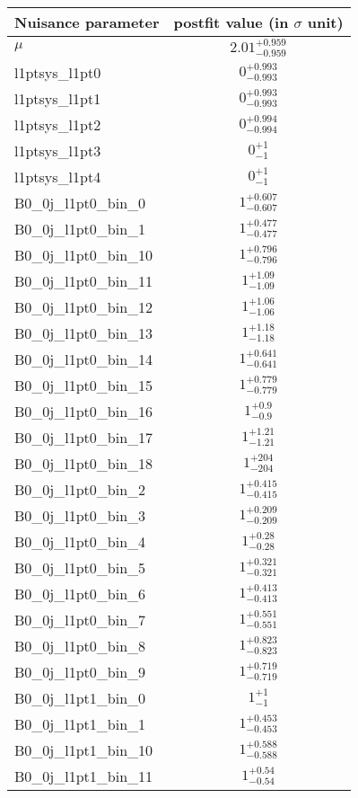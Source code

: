 
\begin{tabular}{|l|c|}
\hline
Nuisance parameter & postfit value (in $\sigma$ unit) \\\hline
$\mu$ & $2.01^{+0.959}_{-0.959}$ \\
l1ptsys\_l1pt0 & $0^{+0.993}_{-0.993}$ \\
l1ptsys\_l1pt1 & $0^{+0.993}_{-0.993}$ \\
l1ptsys\_l1pt2 & $0^{+0.994}_{-0.994}$ \\
l1ptsys\_l1pt3 & $0^{+1}_{-1}$ \\
l1ptsys\_l1pt4 & $0^{+1}_{-1}$ \\
B0\_0j\_l1pt0\_bin\_0 & $1^{+0.607}_{-0.607}$ \\
B0\_0j\_l1pt0\_bin\_1 & $1^{+0.477}_{-0.477}$ \\
B0\_0j\_l1pt0\_bin\_10 & $1^{+0.796}_{-0.796}$ \\
B0\_0j\_l1pt0\_bin\_11 & $1^{+1.09}_{-1.09}$ \\
B0\_0j\_l1pt0\_bin\_12 & $1^{+1.06}_{-1.06}$ \\
B0\_0j\_l1pt0\_bin\_13 & $1^{+1.18}_{-1.18}$ \\
B0\_0j\_l1pt0\_bin\_14 & $1^{+0.641}_{-0.641}$ \\
B0\_0j\_l1pt0\_bin\_15 & $1^{+0.779}_{-0.779}$ \\
B0\_0j\_l1pt0\_bin\_16 & $1^{+0.9}_{-0.9}$ \\
B0\_0j\_l1pt0\_bin\_17 & $1^{+1.21}_{-1.21}$ \\
B0\_0j\_l1pt0\_bin\_18 & $1^{+204}_{-204}$ \\
B0\_0j\_l1pt0\_bin\_2 & $1^{+0.415}_{-0.415}$ \\
B0\_0j\_l1pt0\_bin\_3 & $1^{+0.209}_{-0.209}$ \\
B0\_0j\_l1pt0\_bin\_4 & $1^{+0.28}_{-0.28}$ \\
B0\_0j\_l1pt0\_bin\_5 & $1^{+0.321}_{-0.321}$ \\
B0\_0j\_l1pt0\_bin\_6 & $1^{+0.413}_{-0.413}$ \\
B0\_0j\_l1pt0\_bin\_7 & $1^{+0.551}_{-0.551}$ \\
B0\_0j\_l1pt0\_bin\_8 & $1^{+0.823}_{-0.823}$ \\
B0\_0j\_l1pt0\_bin\_9 & $1^{+0.719}_{-0.719}$ \\
B0\_0j\_l1pt1\_bin\_0 & $1^{+1}_{-1}$ \\
B0\_0j\_l1pt1\_bin\_1 & $1^{+0.453}_{-0.453}$ \\
B0\_0j\_l1pt1\_bin\_10 & $1^{+0.588}_{-0.588}$ \\
B0\_0j\_l1pt1\_bin\_11 & $1^{+0.54}_{-0.54}$ \\

\end{tabular}
